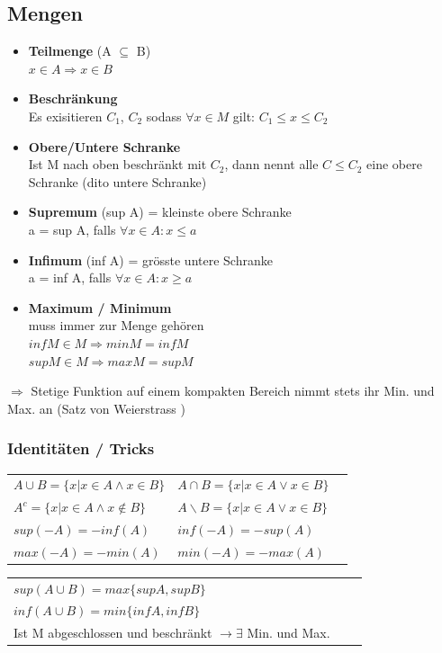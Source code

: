 \documentclass[6pt]{article}
\begin{document}
\begin{multicols*}{3}

\subsection*{Mengen}
\begin{itemize}[itemsep=1pt, parsep=2pt, leftmargin=*,align=left]
	\item {\bf Teilmenge} (A $\subseteq$ B) \\ $x \in A \Rightarrow x \in B$
	\item {\bf Beschr{\"a}nkung} \\Es exisitieren $C_1$, $C_2$ sodass $\forall x \in M$ gilt: $C_1 \leq x \leq C_2$
	\item {\bf Obere/Untere Schranke} \\ Ist M nach oben beschr{\"a}nkt mit $C_2$, dann nennt alle $C \leq C_2$ eine obere Schranke (dito untere Schranke)
	\item {\bf Supremum} (sup A) = kleinste obere Schranke \\ 
				a = sup A, falls $\forall x \in A : x \leq a$ 
	\item {\bf Infimum} (inf A) = gr{\"o}sste untere Schranke	 \\  
				a = inf A, falls $\forall x \in A: x \geq a$ 
	\item {\bf Maximum / Minimum}	\\ muss immer zur Menge geh{\"o}ren \\
				 $inf M \in M \Rightarrow min M = inf M$ \\
				 $sup M \in M \Rightarrow max M = sup M$
\end{itemize}
$\Rightarrow$ Stetige Funktion auf einem kompakten Bereich nimmt stets ihr Min. und Max. an (Satz von Weierstrass )

\subsubsection*{Identit{\"a}ten / Tricks}
\begin{tabular}{lll}
$A \cup B = \lbrace{x | x \in A \land x \in B}\rbrace$ 
	& $A \cap B = \lbrace{x | x \in A \lor x \in B}\rbrace $ \\
$A^c =\lbrace{x | x \in A \land x \not\in B }\rbrace$ 
	& $A\backslash B = \lbrace{x | x \in A \lor x \in B}\rbrace$ \\
$sup(-A)  = - inf(A)$  
	& $inf(-A) = - sup(A)$	 \\
$max(-A) = -min(A)$
	& 	 $min(-A) = - max(A)$ \\
\end{tabular}
\vspace{8mm}
\begin{tabular}{lll}
$sup(A \cup B) = max\lbrace{sup A, sup B}\rbrace$ \\
$inf(A \cup B) = min\lbrace{inf A, inf B}\rbrace$  \\
Ist M abgeschlossen und beschr{\"a}nkt $\rightarrow \exists$ Min. und Max. \\
\end{tabular}


\end{multicols*}
\end{document}
